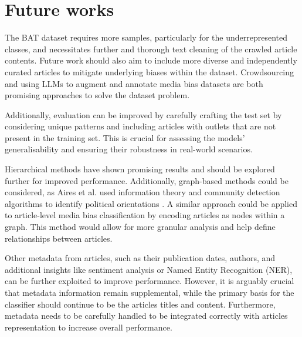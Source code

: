 


\section{Future works}

The BAT dataset requires more samples, particularly for the underrepresented classes, and necessitates further and thorough text cleaning of the crawled article contents. Future work should also aim to include more diverse and independently curated articles to mitigate underlying biases within the dataset. Crowdsourcing \cite{spinde-newsunravel} and using LLMs to augment and annotate media bias datasets \cite{horych-2024-promises} are both promising approaches to solve the dataset problem.

Additionally, evaluation can be improved by carefully crafting the test set by considering unique patterns and including articles with outlets that are not present in the training set. This is crucial for assessing the models' generalisability and ensuring their robustness in real-world scenarios.

Hierarchical methods have shown promising results and should be explored further for improved performance. Additionally, graph-based methods could be considered, as Aires et al. used information theory and community detection algorithms to identify political orientations \cite{aires-2020-information}. A similar approach could be applied to article-level media bias classification by encoding articles as nodes within a graph. This method would allow for more granular analysis and help define relationships between articles.

Other metadata from articles, such as their publication dates, authors, and additional insights like sentiment analysis or Named Entity Recognition (NER), can be further exploited to improve performance. However, it is arguably crucial that metadata information remain supplemental, while the primary basis for the classifier should continue to be the articles titles and content. Furthermore, metadata needs to be carefully handled to be integrated correctly with articles representation to increase overall performance.



